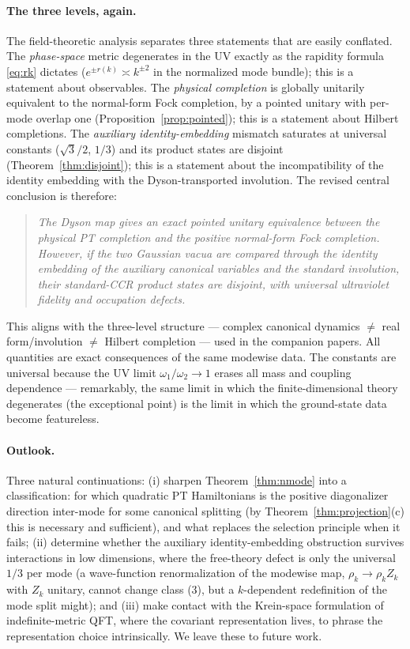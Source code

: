 \documentclass[11pt]{article}
\theoremstyle{definition}
\theoremstyle{remark}
\newcommand{\w}{\omega}
\begin{document}
\paragraph{The three levels, again.}
The field-theoretic analysis separates three statements that are easily
conflated.  The \emph{phase-space} metric degenerates in the UV exactly as
the rapidity formula \eqref{eq:rk} dictates ($e^{\pm r(k)}\asymp
k^{\pm2}$ in the normalized mode bundle); this is a statement about
observables.  The \emph{physical completion} is globally unitarily
equivalent to the normal-form Fock completion, by a pointed unitary with
per-mode overlap one (Proposition~\ref{prop:pointed}); this is a
statement about Hilbert completions.  The \emph{auxiliary
identity-embedding} mismatch saturates at universal constants
($\sqrt3/2$, $1/3$) and its product states are disjoint
(Theorem~\ref{thm:disjoint}); this is a statement about the
incompatibility of the identity embedding with the Dyson-transported
involution.  The revised central conclusion is therefore:
\begin{quote}
\emph{The Dyson map gives an exact pointed unitary equivalence between
the physical PT completion and the positive normal-form Fock completion.
However, if the two Gaussian vacua are compared through the identity
embedding of the auxiliary canonical variables and the standard
involution, their standard-CCR product states are disjoint, with
universal ultraviolet fidelity and occupation defects.}
\end{quote}
This aligns with the three-level structure --- complex canonical dynamics
$\neq$ real form/involution $\neq$ Hilbert completion --- used in the
companion papers.  All quantities are exact consequences of the same
modewise data.  The constants are universal because the UV limit
$\w_1/\w_2\to1$ erases all mass and coupling dependence --- remarkably, the
same limit in which the finite-dimensional theory degenerates (the
exceptional point) is the limit in which the ground-state data become
featureless.

\paragraph{Outlook.}
Three natural continuations: (i) sharpen Theorem~\ref{thm:nmode} into a
classification: for which quadratic PT Hamiltonians is the positive
diagonalizer direction inter-mode for some canonical splitting
(by Theorem~\ref{thm:projection}(c) this is necessary and sufficient), and
what replaces the selection principle when it fails; (ii) determine
whether the auxiliary identity-embedding obstruction
survives interactions in low dimensions, where the free-theory defect
is only the universal $1/3$ per mode (a wave-function renormalization of the
modewise map, $\rho_k\to\rho_k Z_k$ with $Z_k$ unitary, cannot change class
(3), but a $k$-dependent redefinition of the mode split might); and (iii)
make contact with the Krein-space formulation of indefinite-metric QFT,
where the covariant representation lives, to phrase the representation
choice intrinsically.  We leave these to future work.
\end{document}
